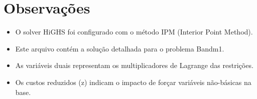 \documentclass[12pt]{article}
\begin{document}
\section{Observações}

\begin{itemize}
\item O solver HiGHS foi configurado com o método IPM (Interior Point Method).
\item Este arquivo contém a solução detalhada para o problema Bandm1.
\item As variáveis duais representam os multiplicadores de Lagrange das restrições.
\item Os custos reduzidos (z) indicam o impacto de forçar variáveis não-básicas na base.
\end{itemize}
\end{document}
